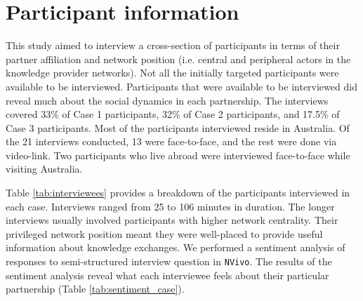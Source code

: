 \section{Participant information}

This study aimed to interview a cross-section of participants in terms of their partner affiliation and network position (i.e. central and peripheral actors in the knowledge provider networks). Not all the initially targeted participants were available to be interviewed. Participants that were available to be interviewed did reveal much about the social dynamics in each partnership. The interviews covered 33\% of Case 1 participants, 32\% of Case 2 participants, and 17.5\% of Case 3 participants. Most of the participants interviewed reside in Australia. Of the 21 interviews conducted, 13 were face-to-face, and the rest were done via video-link. Two participants who live abroad were interviewed face-to-face while visiting Australia. \medskip

Table \ref{tab:interviewees} provides a breakdown of the participants interviewed in each case. Interviews ranged from 25 to 106 minutes in duration. The longer interviews usually involved participants with higher network centrality. Their privileged network position meant they were well-placed to provide useful information about knowledge exchanges. We performed a sentiment analysis of responses to semi-structured interview question in \texttt{NVivo\texttrademark}. The results of the sentiment analysis reveal what each interviewee feels about their particular partnership (Table \ref{tab:sentiment_case}).

